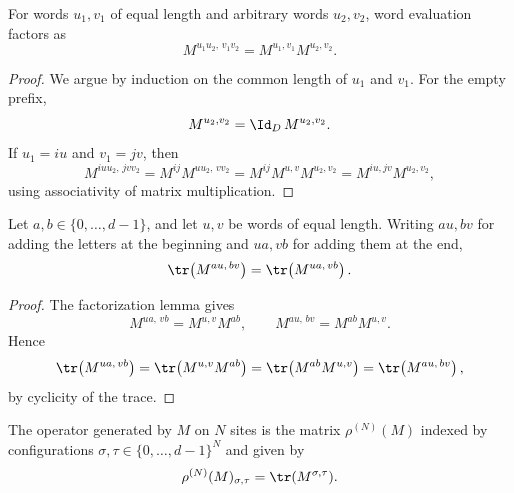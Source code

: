 \begin{lemma}\label{lem:mpo_eval_word_append}
    \leanok
    For words $u_1,v_1$ of equal length and arbitrary words $u_2,v_2$,
    word evaluation factors as
    \[
        M^{u_1u_2,\,v_1v_2}=M^{u_1,v_1}M^{u_2,v_2}.
    \]
\end{lemma}

\begin{proof}\leanok{}
    We argue by induction on the common length of $u_1$ and $v_1$. For the empty prefix,
    \[
        M^{u_2,v_2}=\Id_D\,M^{u_2,v_2}.
    \]
    If $u_1=iu$ and $v_1=jv$, then
    \[
        M^{iuu_2,\,jvv_2}
        = M^{ij}M^{uu_2,\,vv_2}
        = M^{ij}M^{u,v}M^{u_2,v_2}
        = M^{iu,jv}M^{u_2,v_2},
    \]
    using associativity of matrix multiplication.
\end{proof}

\begin{lemma}\label{lem:mpo_trace_evalWord_cyclic}
    \leanok
    Let $a,b\in\{0,\ldots,d{-}1\}$, and let $u,v$ be words of equal length.
    Writing $au,bv$ for adding the letters at the beginning and $ua,vb$ for
    adding them at the end,
    \[
        \tr\!\left(M^{au,\,bv}\right)
        =
        \tr\!\left(M^{ua,\,vb}\right).
    \]
\end{lemma}

\begin{proof}\leanok{}
    The factorization lemma gives
    \[
        M^{ua,\,vb}=M^{u,v}M^{ab},
        \qquad
        M^{au,\,bv}=M^{ab}M^{u,v}.
    \]
    Hence
    \[
        \tr\!\left(M^{ua,\,vb}\right)
        =\tr\!\left(M^{u,v}M^{ab}\right)
        =\tr\!\left(M^{ab}M^{u,v}\right)
        =\tr\!\left(M^{au,\,bv}\right),
    \]
    by cyclicity of the trace.
\end{proof}

\begin{definition}\label{def:mpo_family}
    \leanok
    The operator generated by $M$ on $N$ sites is the matrix
    $\rho^{(N)}(M)$ indexed by configurations
    $\sigma,\tau \in \{0,\ldots,d{-}1\}^N$ and given by
    \[
        \rho^{(N)}(M)_{\sigma,\tau} = \tr(M^{\sigma,\tau}).
    \]
\end{definition}

